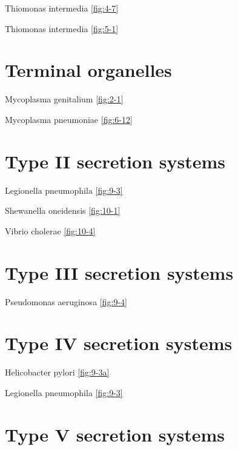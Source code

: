 \documentclass[]{tufte-book}
\begin{document}
Thiomonas intermedia \ref{fig:4-7}

Thiomonas intermedia \ref{fig:5-1}

\hypertarget{terminal-organelles}{%
\section*{Terminal organelles}\label{terminal-organelles}}

Mycoplasma genitalium \ref{fig:2-1}

Mycoplasma pneumoniae \ref{fig:6-12}

\hypertarget{type-ii-secretion-systems}{%
\section*{Type II secretion systems}\label{type-ii-secretion-systems}}

Legionella pneumophila \ref{fig:9-3}

Shewanella oneidensis \ref{fig:10-1}

Vibrio cholerae \ref{fig:10-4}

\hypertarget{type-iii-secretion-systems}{%
\section*{Type III secretion systems}\label{type-iii-secretion-systems}}

Pseudomonas aeruginosa \ref{fig:9-4}

\hypertarget{type-iv-secretion-systems}{%
\section*{Type IV secretion systems}\label{type-iv-secretion-systems}}

Helicobacter pylori \ref{fig:9-3a}

Legionella pneumophila \ref{fig:9-3}

\hypertarget{type-v-secretion-systems}{%
\section*{Type V secretion systems}\label{type-v-secretion-systems}}
\end{document}
